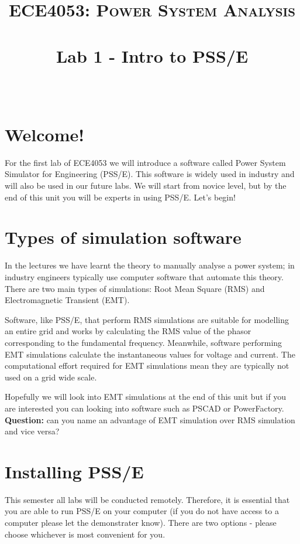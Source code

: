 \documentclass[paper=a4, fontsize=11pt]{article}
\title{	
\normalfont \normalsize \vspace{-1cm}
\textsc{ECE4053: Power System Analysis} \\ [14pt]
\horrule{0.5pt} \\[0.1cm]
\huge Lab 1 - Intro to PSS/E \\
\horrule{2pt} \\[0.2cm]
}
\author{}
\date{}
\begin{document}
\maketitle

\vspace{-1.5cm}
\section{Welcome!}
For the first lab of ECE4053 we will introduce a software called Power System Simulator for Engineering (PSS/E). This software is widely used in industry and will also be used in our future labs. We will start from novice level, but by the end of this unit you will be experts in using PSS/E. Let's begin!

\section{Types of simulation software}
In the lectures we have learnt the theory to manually analyse a power system; in industry engineers typically use computer software that automate this theory. There are two main types of simulations: Root Mean Square (RMS) and Electromagnetic Transient (EMT). 

Software, like PSS/E, that perform RMS simulations are suitable for modelling an entire grid and works by calculating the RMS value of the phasor corresponding to the fundamental frequency. Meanwhile, software performing EMT simulations calculate the instantaneous values for voltage and current. The computational effort required for EMT simulations mean they are typically not used on a grid wide scale.

Hopefully we will look into EMT simulations at the end of this unit but if you are interested you can looking into software such as PSCAD or PowerFactory. \textbf{Question:} can you name an advantage of EMT simulation over RMS simulation and vice versa?

\section{Installing PSS/E}
This semester all labs will be conducted remotely. Therefore, it is essential that you are able to run PSS/E on your computer (if you do not have access to a computer please let the demonstrater know). There are two options - please choose whichever is most convenient for you.
\end{document}

